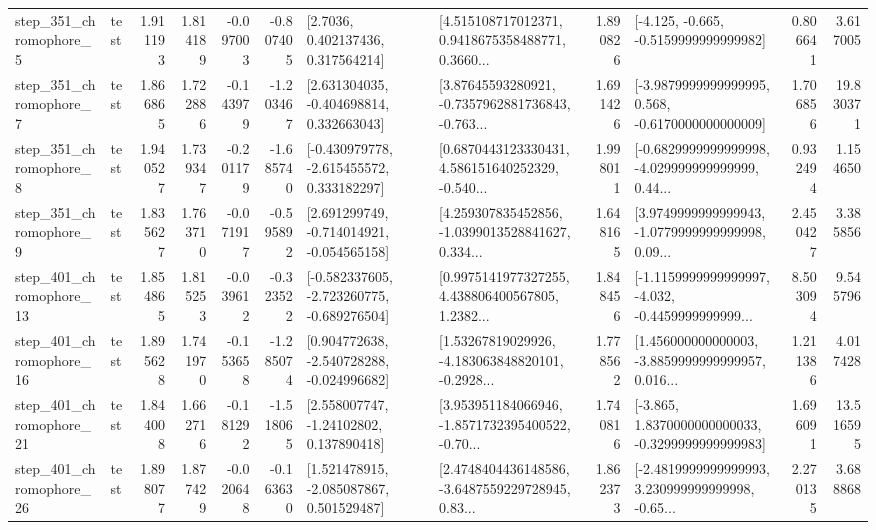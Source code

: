 \begin{tabular}{llrrrrllrlrr}
   step\_351\_chromophore\_5 &      test &      1.911193 &    1.814189 &     -0.097003 & -0.807405 &          [2.7036, 0.402137436, 0.317564214] &  [4.515108717012371, 0.9418675358488771, 0.3660... &       1.890826 &              [-4.125, -0.665, -0.5159999999999982] &            0.806641 &          3.617005 \\
   step\_351\_chromophore\_7 &      test &      1.866865 &    1.722886 &     -0.143979 & -1.203467 &    [2.631304035, -0.404698814, 0.332663043] &  [3.87645593280921, -0.7357962881736843, -0.763... &       1.691426 &  [-3.9879999999999995, 0.568, -0.6170000000000009] &            1.706856 &         19.830371 \\
   step\_351\_chromophore\_8 &      test &      1.940527 &    1.739347 &     -0.201179 & -1.685740 &   [-0.430979778, -2.615455572, 0.333182297] &  [0.6870443123330431, 4.586151640252329, -0.540... &       1.998011 &  [-0.6829999999999998, -4.029999999999999, 0.44... &            0.932494 &          1.154650 \\
   step\_351\_chromophore\_9 &      test &      1.835627 &    1.763710 &     -0.071917 & -0.595892 &   [2.691299749, -0.714014921, -0.054565158] &  [4.259307835452856, -1.0399013528841627, 0.334... &       1.648165 &  [3.9749999999999943, -1.0779999999999998, 0.09... &            2.450427 &          3.385856 \\
  step\_401\_chromophore\_13 &      test &      1.854865 &    1.815253 &     -0.039612 & -0.323522 &  [-0.582337605, -2.723260775, -0.689276504] &  [0.9975141977327255, 4.438806400567805, 1.2382... &       1.848456 &  [-1.1159999999999997, -4.032, -0.4459999999999... &            8.503094 &          9.545796 \\
  step\_401\_chromophore\_16 &      test &      1.895628 &    1.741970 &     -0.153658 & -1.285074 &   [0.904772638, -2.540728288, -0.024996682] &  [1.53267819029926, -4.183063848820101, -0.2928... &       1.778562 &  [1.456000000000003, -3.8859999999999957, 0.016... &            1.211386 &          4.017428 \\
  step\_401\_chromophore\_21 &      test &      1.844008 &    1.662716 &     -0.181292 & -1.518065 &     [2.558007747, -1.24102802, 0.137890418] &  [3.953951184066946, -1.8571732395400522, -0.70... &       1.740816 &  [-3.865, 1.8370000000000033, -0.3299999999999983] &            1.696091 &         13.516595 \\
  step\_401\_chromophore\_26 &      test &      1.898077 &    1.877429 &     -0.020648 & -0.163630 &    [1.521478915, -2.085087867, 0.501529487] &  [2.4748404436148586, -3.6487559229728945, 0.83... &       1.862373 &  [-2.4819999999999993, 3.230999999999998, -0.65... &            2.270135 &          3.688868 \\

\end{tabular}
